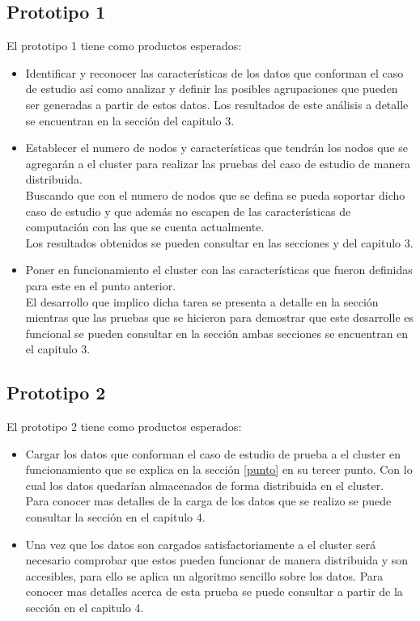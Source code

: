 \subsection{Prototipo 1}
El prototipo 1 tiene como productos esperados:
\begin{itemize}
	\item Identificar y reconocer las características de los datos que conforman el caso de estudio así como analizar y definir las posibles agrupaciones que pueden ser generadas a partir de estos datos. Los resultados de este análisis a detalle se encuentran en la sección  del capitulo 3. 
	\item Establecer el numero de nodos y características que tendrán los nodos  que se agregarán a el cluster para realizar las pruebas del caso de estudio de manera  distribuida.
	\\
	Buscando que con el numero de nodos que se defina se pueda soportar dicho caso de estudio y que además no escapen de las características de computación con las que se cuenta actualmente.
	\\
	Los resultados obtenidos se pueden consultar en las secciones  y  del capitulo 3.
	\item Poner en funcionamiento el cluster con las características que fueron definidas para este en el punto anterior. \label{punto}
	\\
	El desarrollo que implico dicha tarea se presenta a detalle en la sección  mientras que las pruebas que se hicieron para demostrar que este desarrolle es funcional se pueden consultar en la sección  ambas secciones se encuentran en el capitulo 3.
\end{itemize} 
\subsection{Prototipo 2}
El prototipo 2 tiene como productos esperados:
\begin{itemize}
	\item Cargar los datos que conforman el caso de estudio de prueba a el cluster en funcionamiento que se explica en la sección \ref{punto} en su tercer punto. Con lo cual los datos quedarían almacenados de forma distribuida en el cluster.
	\\
	Para conocer mas detalles de la carga de los datos que se realizo se puede consultar la sección  en el capitulo 4.	
	\item Una vez que los datos son cargados satisfactoriamente a el cluster será necesario comprobar que estos pueden funcionar de manera distribuida y son accesibles, para ello se aplica un algoritmo sencillo sobre los datos. Para conocer mas detalles acerca de esta prueba se puede consultar a partir de la sección   en el capitulo 4.
	

\end{itemize} 